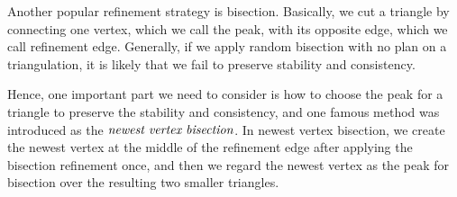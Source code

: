     Another popular refinement strategy is bisection. Basically, we cut a triangle by connecting one vertex, which we call the peak, with its opposite edge, which we call refinement edge. Generally, if we apply random bisection with no plan on a triangulation, it is likely that we fail to preserve stability and consistency.

    Hence, one important part we need to consider is how to choose the peak for a triangle to preserve the stability and consistency, and one famous method was introduced as the $\emph{newest vertex bisection}$. In newest vertex bisection, we create the newest vertex at the middle of the refinement edge after applying the bisection refinement once, and then we regard the newest vertex as the peak for bisection over the resulting two smaller triangles.


